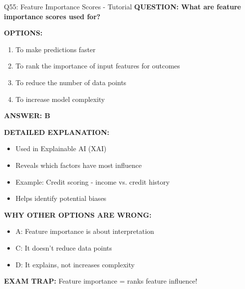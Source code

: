 \documentclass[8pt]{beamer}
\begin{document}
	\begin{frame}{Q55: Feature Importance Scores - Tutorial}
		\fontsize{6.5}{7.5}\selectfont
		\textbf{QUESTION: What are feature importance scores used for?}
		
		\vspace{0.1cm}
		\textbf{OPTIONS:}
		\begin{enumerate}
			\item To make predictions faster
			\item To rank the importance of input features for outcomes
			\item To reduce the number of data points
			\item To increase model complexity
		\end{enumerate}
		
		\vspace{0.1cm}
		\textcolor{myblue}{\textbf{ANSWER: B}}
		
		\vspace{0.1cm}
		\textbf{DETAILED EXPLANATION:}
		\begin{itemize}
			\item Used in Explainable AI (XAI)
			\item Reveals which factors have most influence
			\item Example: Credit scoring - income vs. credit history
			\item Helps identify potential biases
		\end{itemize}
		
		\vspace{0.1cm}
		\textcolor{myred}{\textbf{WHY OTHER OPTIONS ARE WRONG:}}
		\begin{itemize}
			\item \textcolor{myred}{A:} Feature importance is about interpretation
			\item \textcolor{myred}{C:} It doesn't reduce data points
			\item \textcolor{myred}{D:} It explains, not increases complexity
		\end{itemize}
		
		\textcolor{myred}{\textbf{EXAM TRAP:}} Feature importance = \textcolor{myblue}{ranks feature influence}!
	\end{frame}
	
\end{document}
